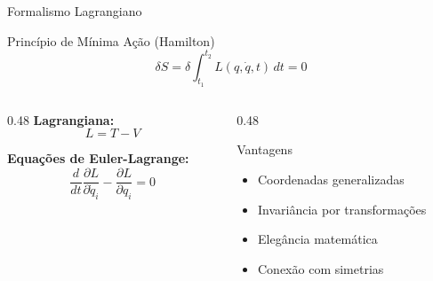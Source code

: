 \documentclass[aspectratio=169,12pt]{beamer}
\begin{document}
\begin{frame}{Formalismo Lagrangiano}
    \begin{block}{Princípio de Mínima Ação (Hamilton)}
        \begin{equation*}
            \delta S = \delta \int_{t_1}^{t_2} L(q, \dot{q}, t) \, dt = 0
        \end{equation*}
    \end{block}

    \begin{columns}[T]
        \begin{column}{0.48\textwidth}
            \textbf{Lagrangiana:}
            \begin{equation*}
                L = T - V
            \end{equation*}

            \textbf{Equações de Euler-Lagrange:}
            \begin{equation*}
                \frac{d}{dt}\frac{\partial L}{\partial \dot{q}_i} - \frac{\partial L}{\partial q_i} = 0
            \end{equation*}
        \end{column}
        \begin{column}{0.48\textwidth}
            \begin{block}{Vantagens}
                \begin{itemize}
                    \item Coordenadas generalizadas
                    \item Invariância por transformações
                    \item Elegância matemática
                    \item Conexão com simetrias
                \end{itemize}
            \end{block}
        \end{column}
    \end{columns}
\end{frame}
\end{document}
